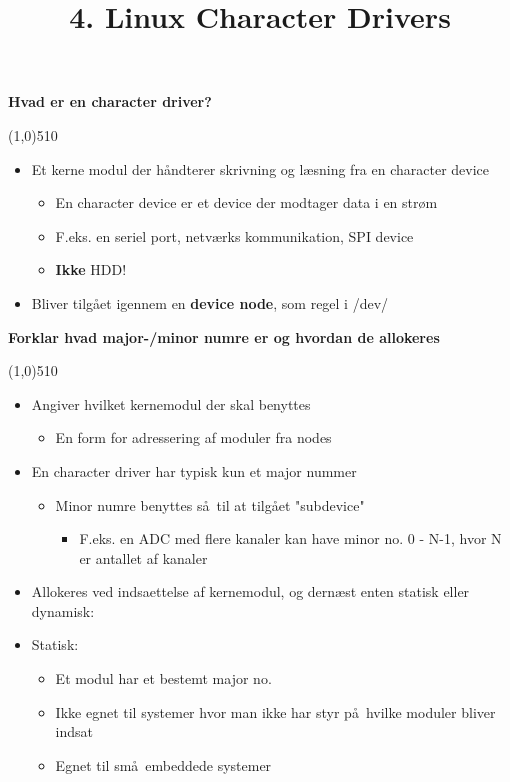 \documentclass{paper}
\title{4. Linux Character Drivers}
\begin{document}
\maketitle
\begin{large}\textbf{Hvad er en character driver?}\end{large}

\line(1,0){510}
\begin{itemize}
	\item Et kerne modul der h\aa ndterer skrivning og l\ae sning fra en character device
	\begin{itemize}
		\item En character device er et device der modtager data i en str\o m
		\item F.eks. en seriel port, netv\ae rks kommunikation, SPI device
		\item \textbf{Ikke} HDD!
	\end{itemize}
	\item Bliver tilg\aa et igennem en \textbf{device node}, som regel i /dev/
	\\
\end{itemize}

\begin{large}\textbf{Forklar hvad major-/minor numre er og hvordan de allokeres}\end{large}

\line(1,0){510}
\begin{itemize}
	\item Angiver hvilket kernemodul der skal benyttes
	\begin{itemize}
		\item En form for adressering af moduler fra nodes
	\end{itemize}
	\item En character driver har typisk kun et major nummer
	\begin{itemize}
		\item Minor numre benyttes s\aa\  til at tilg\aa  et "subdevice"
		\begin{itemize}
			\item F.eks. en ADC med flere kanaler kan have minor no. 0 - N-1, hvor N er antallet af kanaler
		\end{itemize}
	\end{itemize}
	\item Allokeres ved indsaettelse af kernemodul, og dern\ae st enten statisk eller dynamisk:
	\item Statisk:
	\begin{itemize}
		\item Et modul har et bestemt major no.
		\item Ikke egnet til systemer hvor man ikke har styr p\aa\  hvilke moduler bliver indsat
		\item Egnet til sm\aa\  embeddede systemer
		\\
	\end{itemize}
\end{itemize}
\end{document}
